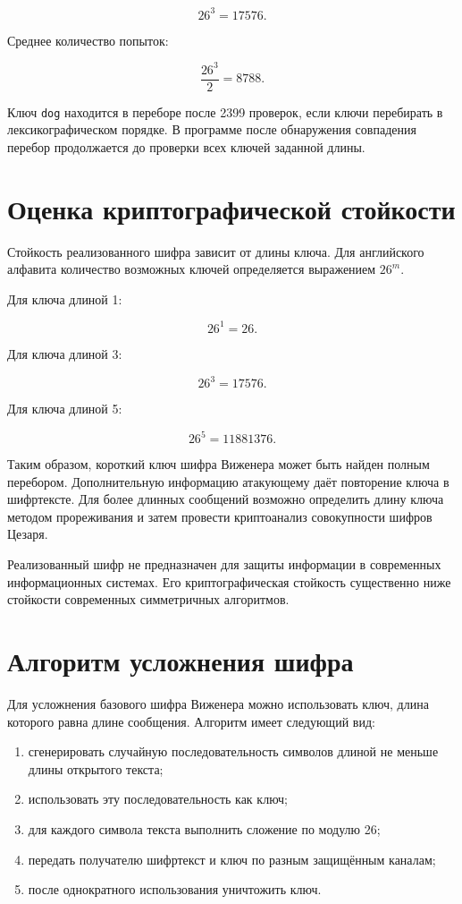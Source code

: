 \documentclass[a4paper,14pt,oneside]{extarticle}
\begin{document}
\[
26^3=17576.
\]

Среднее количество попыток:

\[
\frac{26^3}{2}=8788.
\]

Ключ \texttt{dog} находится в переборе после 2399 проверок, если ключи
перебирать в лексикографическом порядке. В программе после обнаружения
совпадения перебор продолжается до проверки всех ключей заданной длины.

\section{Оценка криптографической стойкости}

Стойкость реализованного шифра зависит от длины ключа. Для английского
алфавита количество возможных ключей определяется выражением $26^m$.

Для ключа длиной 1:

\[
26^1=26.
\]

Для ключа длиной 3:

\[
26^3=17576.
\]

Для ключа длиной 5:

\[
26^5=11881376.
\]

Таким образом, короткий ключ шифра Виженера может быть найден полным
перебором. Дополнительную информацию атакующему даёт повторение ключа в
шифртексте. Для более длинных сообщений возможно определить длину ключа
методом прореживания и затем провести криптоанализ совокупности шифров
Цезаря.

Реализованный шифр не предназначен для защиты информации в современных
информационных системах. Его криптографическая стойкость существенно ниже
стойкости современных симметричных алгоритмов.

\section{Алгоритм усложнения шифра}

Для усложнения базового шифра Виженера можно использовать ключ, длина
которого равна длине сообщения. Алгоритм имеет следующий вид:

\begin{enumerate}
\item сгенерировать случайную последовательность символов длиной не меньше
длины открытого текста;
\item использовать эту последовательность как ключ;
\item для каждого символа текста выполнить сложение по модулю 26;
\item передать получателю шифртекст и ключ по разным защищённым каналам;
\item после однократного использования уничтожить ключ.
\end{enumerate}
\end{document}
